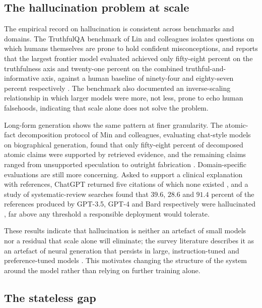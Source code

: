 \subsection{The hallucination problem at scale}
\label{sec:halluc-scale}

The empirical record on hallucination is consistent across benchmarks and domains. The TruthfulQA benchmark of Lin and colleagues isolates questions on which humans themselves are prone to hold confident misconceptions, and reports that the largest frontier model evaluated achieved only fifty-eight percent on the truthfulness axis and twenty-one percent on the combined truthful-and-informative axis, against a human baseline of ninety-four and eighty-seven percent respectively \cite{lin-etal-2022-truthfulqa}. The benchmark also documented an inverse-scaling relationship in which larger models were more, not less, prone to echo human falsehoods, indicating that scale alone does not solve the problem.

Long-form generation shows the same pattern at finer granularity. The atomic-fact decomposition protocol of Min and colleagues, evaluating chat-style models on biographical generation, found that only fifty-eight percent of decomposed atomic claims were supported by retrieved evidence, and the remaining claims ranged from unsupported speculation to outright fabrication \cite{min-etal-2023-factscore}. Domain-specific evaluations are still more concerning. Asked to support a clinical explanation with references, ChatGPT returned five citations of which none existed \cite{alkaissi2023artificial}, and a study of systematic-review searches found that $39.6$, $28.6$ and $91.4$ percent of the references produced by GPT-3.5, GPT-4 and Bard respectively were hallucinated \cite{info:doi/10.2196/53164}, far above any threshold a responsible deployment would tolerate.

These results indicate that hallucination is neither an artefact of small models nor a residual that scale alone will eliminate; the survey literature describes it as an artefact of neural generation that persists in large, instruction-tuned and preference-tuned models \cite{ji2023survey,huang2025survey}. This motivates changing the structure of the system around the model rather than relying on further training alone.

\subsection{The stateless gap}
\label{sec:stateless-gap}

